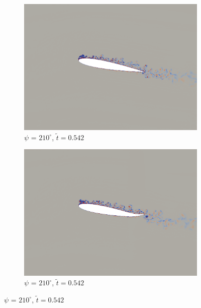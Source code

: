 \begin{figure}[H]
	\begin{subfigure}[b]{0.4\textwidth}
		\centering
		\includegraphics[width=1\textwidth]{figures/mu_2pt0/vorticity/baseline/phase_210.png}
		\caption{ $\psi$ = $210^\circ$, $\tilde{t}=0.542$}
		\label{fig:mu_2pt0_baseline_psi210}
	\end{subfigure}
	\begin{subfigure}[b]{0.4\textwidth}
		\centering
		\includegraphics[width=1\textwidth]{figures/mu_2pt0/vorticity/AC/phase_210.png}
		\caption{ $\psi$ = $210^\circ$, $\tilde{t}=0.542$}
		\label{fig:mu_2pt0_AC_psi210}
	\end{subfigure}
	

\end{figure}
